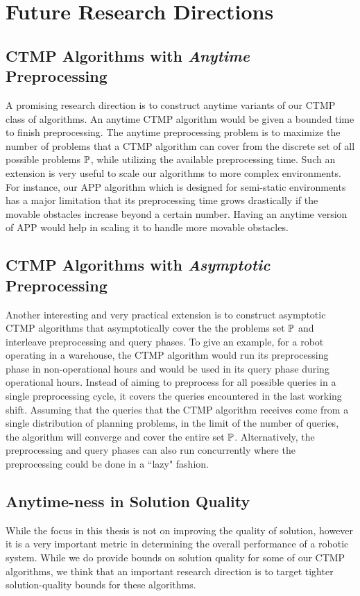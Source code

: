 \documentclass[a4paper]{report}
\begin{document}
\newpage

\section{Future Research Directions}

\subsection{CTMP Algorithms with \emph{Anytime} Preprocessing}
A promising research direction is to construct anytime variants of our CTMP class of algorithms. An anytime CTMP algorithm would be given a bounded time to finish preprocessing. The anytime preprocessing problem is to maximize the number of problems that a CTMP algorithm can cover from the discrete set of all possible problems $\mathbb{P}$, while utilizing the available preprocessing time. Such an extension is very useful to scale our algorithms to more complex environments. For instance, our APP algorithm which is designed for semi-static environments has a major limitation that its preprocessing time grows drastically if the movable obstacles increase beyond a certain number. Having an anytime version of APP would help in scaling it to handle more movable obstacles.

\subsection{CTMP Algorithms with \emph{Asymptotic} Preprocessing}
Another interesting and very practical extension is to construct asymptotic CTMP algorithms that asymptotically cover the the problems set $\mathbb{P}$ and interleave preprocessing and query phases. To give an example, for a robot operating in a warehouse, the CTMP algorithm would run its preprocessing phase in non-operational hours and would be used in its query phase during operational hours. Instead of aiming to preprocess for all possible queries in a single preprocessing cycle, it covers the queries encountered in the last working shift. Assuming that the queries that the CTMP algorithm receives come from a single distribution of planning problems, in the limit of the number of queries, the algorithm will converge and cover the entire set $\mathbb{P}$. Alternatively, the preprocessing and query phases can also run concurrently where the preprocessing could be done in a ``lazy" fashion. 

\subsection{Anytime-ness in Solution Quality}
While the focus in this thesis is not on improving the quality of solution, however it is a very important metric in determining the overall performance of a robotic system. While we do provide bounds on solution quality for some of our CTMP algorithms, we think that an important research direction is to target tighter solution-quality bounds for these algorithms.
\end{document}
